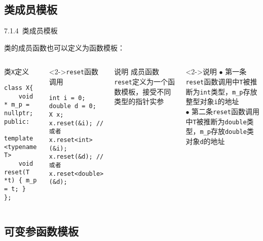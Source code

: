 
\subsection{类成员模板}

\begin{frame}[fragile]{7.1.4~类成员模板}

类的成员函数也可以定义为函数模板：

\vspace{-4mm}

\begin{columns}[t]

\begin{blueblock}{类\texttt{X}定义}
\begin{lstlisting}[moreemph={T}]
class X{
    void * m_p = nullptr;
public:
    template <typename T>
    void reset(T *t) { m_p = t; }
};
\end{lstlisting}
\end{blueblock}
\begin{blueblock}<2->{\texttt{reset}函数调用}
\begin{lstlisting}[moreemph={T}]
int i = 0;
double d = 0;
X x;
x.reset(&i); // 或者x.reset<int>(&i);
x.reset(&d); // 或者x.reset<double>(&d);
\end{lstlisting}
\end{blueblock}

\begin{yellowblock}{说明}
成员函数\texttt{reset}定义为一个函数模板，接受不同类型的指针实参
\end{yellowblock}
\begin{yellowblock}<2->{说明}
$\bullet$ 第一条\texttt{reset}函数调用中\texttt{T}被推断为\texttt{int}类型，\texttt{m\_p}存放整型对象\texttt{i}的地址\\
$\bullet$ 第二条\texttt{reset}函数调用中\texttt{T}被推断为\texttt{double}类型，\texttt{m\_p}存放\texttt{double}类对象\texttt{d}的地址
\end{yellowblock}

\end{columns}

\end{frame}



\subsection{可变参函数模板}

